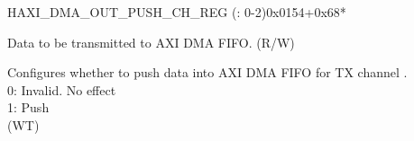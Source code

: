 \begin{register}{H}{AXI\_DMA\_OUT\_PUSH\_CH\_REG (: 0-2)}{0x0154+0x68*}\label{regdesc:AXIDMAOUTPUSHCHNREG}
%
%
%
\regnewline%
\begin{regdesc}\begin{reglist}
\label{fielddesc:AXIDMAOUTFIFOWDATACHN}\item [AXI\_DMA\_OUTFIFO\_WDATA\_CH\regindex{n}] Data to be transmitted to AXI DMA FIFO. (R/W)
\label{fielddesc:AXIDMAOUTFIFOPUSHCHN}\item [AXI\_DMA\_OUTFIFO\_PUSH\_CH\regindex{n}] Configures whether to push data into AXI DMA FIFO for TX channel .\\0: Invalid. No effect\\1: Push\\ (WT)
\end{reglist}\end{regdesc}
\end{register}


